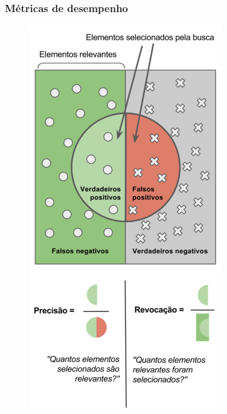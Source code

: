 \documentclass{beamer}
\begin{document}
    \begin{frame}
        \frametitle{Métricas de desempenho}
        \begin{figure}[!ht]
            \centering
            \begin{minipage}[c]{0.4\textwidth}
                \includegraphics[width=\columnwidth]{Imagens/Precisão_e_revocação.png}

\end{minipage}
\end{figure}
\end{frame}
\end{document}
